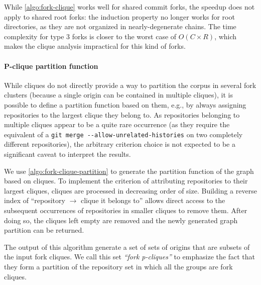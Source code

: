While \cref{algo:fork-clique} works well for shared commit forks, the
speedup does not apply to shared root forks: the induction property no longer
works for root directories, as they are not organized in nearly-degenerate
chains. The time complexity for type 3 forks is closer to the worst case of
$O(C \times R)$, which makes the clique analysis impractical for this
kind of forks.

\paragraph{P-clique partition function}
While cliques do not directly provide a way to partition the corpus in several
fork clusters (because a single origin can be contained in multiple cliques),
it is possible to define a partition function based on them, e.g., by always
assigning repositories to the largest clique they belong to. As repositories
belonging to multiple cliques appear to be a quite rare occurrence (as they
require the equivalent of a \texttt{git merge -{}-allow-unrelated-histories} on
two completely different repositories), the arbitrary criterion choice is not
expected to be a significant caveat to interpret the results.

We use \cref{algo:fork-clique-partition} to generate the partition function of
the graph based on cliques. To implement the criterion of attributing
repositories to their largest cliques, cliques are processed in decreasing
order of size. Building a reverse index of ``repository $\rightarrow$ clique it
belongs to'' allows direct access to the subsequent occurrences of repositories
in smaller cliques to remove them. After doing so, the cliques left empty are
removed and the newly generated graph partition can be returned.

The output of this algorithm generate a set of sets of origins that are subsets
of the input fork cliques. We call this set \emph{``fork p-cliques''} to
emphasize the fact that they form a partition of the repository set in which
all the groups are fork cliques.

